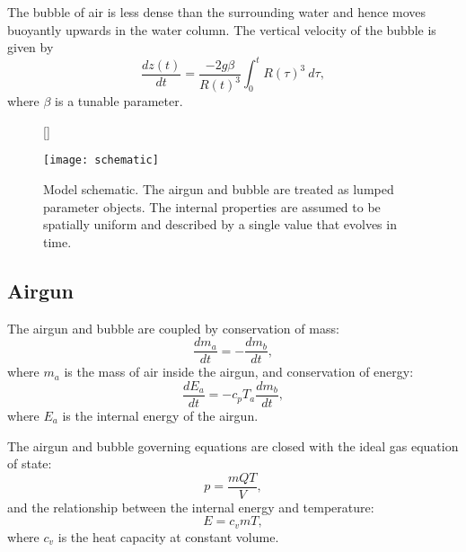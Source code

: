 \documentclass[10pt]{article}
\begin{document}
The bubble of air is less dense than the surrounding water and hence moves buoyantly upwards in the water column. The vertical velocity of the bubble is given by \cite{Herring1941, Taylor1942, Langhammer1996}
\begin{equation}
\frac{dz(t)}{dt} = \frac{-2 g \beta}{R(t)^3} \int_0^t R(\tau)^3~d\tau,
\label{eq:depth}
\end{equation}
where $\beta$ is a tunable parameter.

\begin{figure}[t!]
\centering
{}[\FBwidth]
{\caption{Model schematic. The airgun and bubble are treated as lumped parameter objects. The internal properties are assumed to be spatially uniform and described by a single value that evolves in time. }
\label{fig:schematic}}
{\texttt{[image: schematic]}}
\end{figure}

\subsection{Airgun}
The airgun and bubble are coupled by conservation of mass:
\begin{equation}
\frac{dm_a}{dt} = -\frac{dm_b}{dt},
\end{equation}
where $m_a$ is the mass of air inside the airgun, and conservation of energy:
\begin{equation}
\frac{dE_a}{dt} = -c_p T_a \frac{dm_b}{dt},
\end{equation}
where $E_a$ is the internal energy of the airgun. 

The airgun and bubble governing equations are closed with the ideal gas equation of state:
\begin{equation}
p = \frac{mQT}{V},
\label{eq:ideal gas law}
\end{equation}
and the relationship between the internal energy and temperature:
\begin{equation}
E = c_v m T,
\end{equation}
where $c_v$ is the heat capacity at constant volume. 
\end{document}
